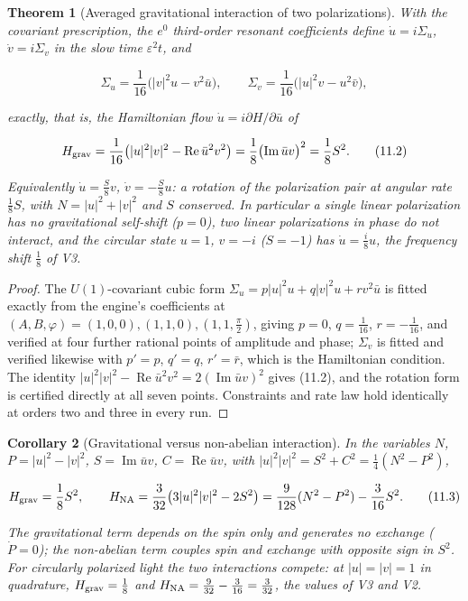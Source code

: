 \documentclass[11pt]{article}
\newtheorem{theorem}{Theorem}[section]
\newtheorem{corollary}[theorem]{Corollary}
\theoremstyle{remark}
\begin{document}
\begin{theorem}[Averaged gravitational interaction of two polarizations]
\label{thm:v20v8-hamiltonian}
With the covariant prescription, the \(e^0\) third-order resonant
coefficients define \(\dot u=i\Sigma_u\), \(\dot v=i\Sigma_v\) in the
slow time \(\varepsilon^2t\), and

\[
 \Sigma_u=\frac1{16}\bigl(|v|^2u-v^2\bar u\bigr),\qquad
 \Sigma_v=\frac1{16}\bigl(|u|^2v-u^2\bar v\bigr),                        \tag{11.1}
\]

exactly, that is, the Hamiltonian flow \(\dot u=i\partial H/\partial\bar u\)
of

\[
 H_{\rm grav}=\frac1{16}\bigl(|u|^2|v|^2-\operatorname{Re}\bar u^2v^2\bigr)
 =\frac18\bigl(\operatorname{Im}\bar uv\bigr)^2=\frac18S^2.              \tag{11.2}
\]

Equivalently \(\dot u=\tfrac S8v\), \(\dot v=-\tfrac S8u\): a rotation of
the polarization pair at angular rate \(\tfrac18S\), with \(N=|u|^2+|v|^2\)
and \(S\) conserved.  In particular a single linear polarization has
no gravitational self-shift (\(p=0\)), two linear polarizations in
phase do not interact, and the circular state \(u=1\), \(v=-i\)
(\(S=-1\)) has \(\dot u=\tfrac i8u\), the frequency shift \(\tfrac18\) of
V3.
\end{theorem}

\begin{proof}
The \(U(1)\)-covariant cubic form \(\Sigma_u=p|u|^2u+q|v|^2u+rv^2\bar u\)
is fitted exactly from the engine's coefficients at
\((A,B,\varphi)=(1,0,0),(1,1,0),(1,1,\tfrac\pi2)\), giving
\(p=0\), \(q=\tfrac1{16}\), \(r=-\tfrac1{16}\), and verified at four
further rational points of amplitude and phase; \(\Sigma_v\) is fitted
and verified likewise with \(p'=p\), \(q'=q\), \(r'=\bar r\), which is the
Hamiltonian condition.  The identity
\(|u|^2|v|^2-\operatorname{Re}\bar u^2v^2=2(\operatorname{Im}\bar uv)^2\)
gives (11.2), and the rotation form is certified directly at all seven
points.  Constraints and rate law hold identically at orders two and
three in every run.
\end{proof}

\begin{corollary}[Gravitational versus non-abelian interaction]
\label{cor:v20v8-comparison}
In the variables \(N\), \(P=|u|^2-|v|^2\), \(S=\operatorname{Im}\bar uv\),
\(C=\operatorname{Re}\bar uv\), with \(|u|^2|v|^2=S^2+C^2=\tfrac14(N^2-P^2)\),

\[
 H_{\rm grav}=\frac18S^2,\qquad
 H_{\rm NA}=\frac3{32}\bigl(3|u|^2|v|^2-2S^2\bigr)=\frac9{128}(N^2-P^2)-\frac3{16}S^2.
                                                                    \tag{11.3}
\]

The gravitational term depends on the spin only and generates no
exchange (\(\dot P=0\)); the non-abelian term couples spin and exchange
with opposite sign in \(S^2\).  For circularly polarized light the two
interactions compete: at \(|u|=|v|=1\) in quadrature, \(H_{\rm grav}=\tfrac18\)
and \(H_{\rm NA}=\tfrac9{32}-\tfrac3{16}=\tfrac3{32}\), the values of V3
and V2.
\end{corollary}
\end{document}
